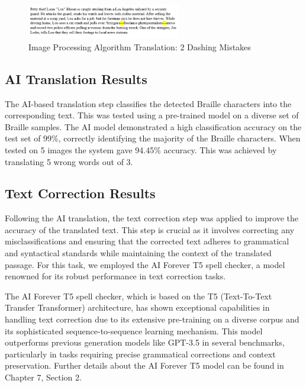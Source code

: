         \begin{figure}[h!]
            \centering
            \includegraphics[width=0.6\textwidth]{ip.png}
            
            \caption{Image Processing Algorithm Translation: 2 Dashing Mistakes}
        \end{figure}

\subsection{AI Translation Results}
The AI-based translation step classifies the detected Braille characters into the corresponding text. This was tested using a pre-trained model on a diverse set of Braille samples. The AI model demonstrated a high classification accuracy on the test set of 99\%, correctly identifying the majority of the Braille characters.
When tested on 5 images the system gave 94.45\% accuracy. This was achieved by translating 5 wrong words out of 3.



\subsection{Text Correction Results}
Following the AI translation, the text correction step was applied to improve the accuracy of the translated text. This step is crucial as it involves correcting any misclassifications and ensuring that the corrected text adheres to grammatical and syntactical standards while maintaining the context of the translated passage. For this task, we employed the AI Forever T5 spell checker, a model renowned for its robust performance in text correction tasks.

The AI Forever T5 spell checker, which is based on the T5 (Text-To-Text Transfer Transformer) architecture, has shown exceptional capabilities in handling text correction due to its extensive pre-training on a diverse corpus and its sophisticated sequence-to-sequence learning mechanism. This model outperforms previous generation models like GPT-3.5 in several benchmarks, particularly in tasks requiring precise grammatical corrections and context preservation. Further details about the AI Forever T5 model can be found in Chapter 7, Section 2.

